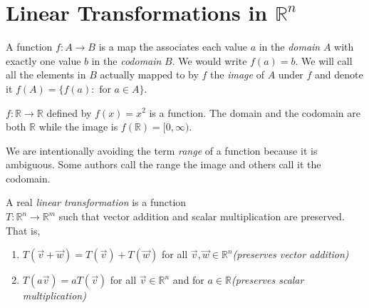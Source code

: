 \section{Linear Transformations in $\mathbb{R}^n$}

\begin{definition}[Function]
A function $f:A \to B$ is a map the associates each value $a$ in the  
\emph{domain} $A$ with exactly one value $b$ in the \emph{codomain} $B$. 
We would write $f(a)=b$. We will call all the elements in $B$ actually mapped 
to by $f$ the \emph{image} of $A$ under $f$ and denote it 
$f(A)=\{ f(a):\text{ for } a \in A  \}$.
\end{definition}
\begin{example}$f:\mathbb{R} \to \mathbb{R}$ defined by $f(x)=x^2$ is a 
function. The domain  and the codomain are both $\mathbb{R}$ while the 
image is $f(\mathbb{R})=[0,\infty )$.
\end{example}
\begin{remark}
We are intentionally avoiding the term \emph{range} of a function because it is 
ambiguous. Some authors call the range the image and others call it the 
codomain.
\end{remark}
\begin{definition}
A real \emph{linear transformation} is a function\\ 
$T: \mathbb{R}^n \to \mathbb{R}^m$ such that vector addition and scalar 
multiplication are preserved. That is, 
\begin{enumerate}
\item $T(\vec{v}+\vec{w})=T(\vec{v})+T(\vec{w})$ for all 
$\vec{v},\vec{w} \in \mathbb{R}^n$\hfill \emph{(preserves vector addition)}
\item $T(a\vec{v})=aT(\vec{v})$ for all $\vec{v}\in \mathbb{R}^n$ 
and for $a \in \mathbb{R}$\hfill \emph{(preserves scalar multiplication)}
\end{enumerate}
\end{definition}

